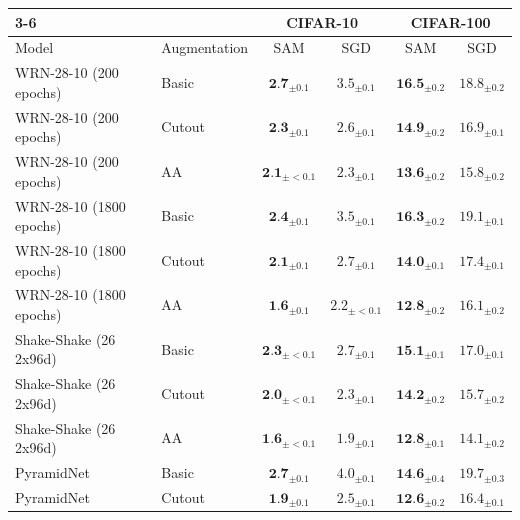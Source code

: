 \documentclass{article} %
\begin{document}
\begin{table}[!htb]
\begin{tabular}{ll|cc|cc|}
\cline{3-6}
                                                  &                                        & \multicolumn{2}{c|}{CIFAR-10}             & \multicolumn{2}{c|}{CIFAR-100}             \\ \hline
\multicolumn{1}{|l|}{Model}                       & Augmentation & SAM                          & SGD & SAM                           & SGD \\ \hline
\multicolumn{1}{|l|}{WRN-28-10 (200 epochs)}  & Basic             & $\textbf{2.7}_{\pm 0.1}$  & $3.5_{\pm 0.1}$       & $\textbf{16.5}_{\pm 0.2}$  & $18.8_{\pm 0.2}$     \\
\multicolumn{1}{|l|}{WRN-28-10 (200 epochs)}  & Cutout            & $\textbf{2.3}_{\pm 0.1}$  & $2.6_{\pm 0.1}$       & $\textbf{14.9}_{\pm 0.2}$ & $16.9_{\pm 0.1}$    \\
\multicolumn{1}{|l|}{WRN-28-10 (200 epochs)}  & AA   & $\textbf{2.1}_{\pm <0.1}$  & $2.3_{\pm 0.1}$       & $\textbf{13.6}_{\pm 0.2}$ & $15.8_{\pm 0.2}$     \\ \hline
\multicolumn{1}{|l|}{WRN-28-10 (1800 epochs)} & Basic          & $\textbf{2.4}_{\pm 0.1}$  & $3.5_{\pm 0.1}$       & $\textbf{16.3}_{\pm 0.2}$ & $19.1_{\pm 0.1}$     \\
\multicolumn{1}{|l|}{WRN-28-10 (1800 epochs)} & Cutout           & $\textbf{2.1}_{\pm 0.1}$  & $2.7_{\pm 0.1}$       & $\textbf{14.0}_{\pm 0.1}$ & $17.4_{\pm 0.1}$     \\
\multicolumn{1}{|l|}{WRN-28-10 (1800 epochs)} & AA        & $\textbf{1.6}_{\pm 0.1}$  & $2.2_{\pm <0.1}$       & $\textbf{12.8}_{\pm 0.2}$ & $16.1_{\pm 0.2}$     \\ \hline
\multicolumn{1}{|l|}{Shake-Shake (26 2x96d)}      & Basic       & $\textbf{2.3}_{\pm <0.1}$  & $2.7_{\pm 0.1}$       & $\textbf{15.1}_{\pm 0.1}$ & $17.0_{\pm 0.1}$     \\
\multicolumn{1}{|l|}{Shake-Shake (26 2x96d)}      & Cutout            & $\textbf{2.0}_{\pm <0.1}$  & $2.3_{\pm 0.1}$       & $\textbf{14.2}_{\pm 0.2}$ & $15.7_{\pm 0.2}$     \\
\multicolumn{1}{|l|}{Shake-Shake (26 2x96d)}      & AA          & $\textbf{1.6}_{\pm <0.1}$  & $1.9_{\pm 0.1}$       & $\textbf{12.8}_{\pm 0.1}$ & $14.1_{\pm 0.2}$     \\ \hline
\multicolumn{1}{|l|}{PyramidNet}                  & Basic      & $\textbf{2.7}_{\pm 0.1}$   & $4.0_{\pm 0.1}$      & $\textbf{14.6}_{\pm 0.4}$ & $19.7_{\pm 0.3}$     \\
\multicolumn{1}{|l|}{PyramidNet}                  & Cutout              & $\textbf{1.9}_{\pm 0.1}$  & $2.5_{\pm 0.1}$       & $\textbf{12.6}_{\pm 0.2}$ & $16.4_{\pm 0.1}$     \\

\end{tabular}
\end{table}
\end{document}
